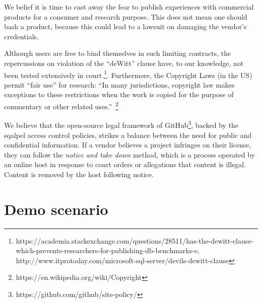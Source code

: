 \documentclass{cidr-2019}
\begin{document}
We belief it is time to cast away the fear to publish experiences with
commercial products for a consumer and research purpose.
This does not mean one should bash a product, because this could lead to a lawsuit on damaging the vendor's
credentials. 

 Although users are free to bind themselves in such limiting
 contracts, the repercussions on violation of the ``deWitt'' clause
 have, to our knowledge, not been tested extensively in
 court.\footnote{https://academia.stackexchange.com/questions/28511/has-the-dewitt-clause-which-prevents-researchers-for-publishing-db-benchmarks-e,
   http://www.itprotoday.com/microsoft-sql-server/devils-dewitt-clause}.
 Furthermore, the Copyright Laws (in the US) permit ``fair use'' for
 research: ``In many jurisdictions, copyright law makes exceptions to
 these restrictions when the work is copied for the purpose of
 commentary or other related
 uses.''~\footnote{https://en.wikipedia.org/wiki/Copyright}


We believe that the open-source legal framework of
GitHub\footnote{https://github.com/github/site-policy/}, backed by
the {\sc sqalpel} access control policies, strikes a balance between
the need for public and confidential information. If a vendor believes
a project infringes on their license, they can follow the \emph{notice
  and take down} method, which is a process operated by an online host
in response to court orders or allegations that content is
illegal. Content is removed by the host following notice.



\section{Demo scenario}\label{demo}
\end{document}
